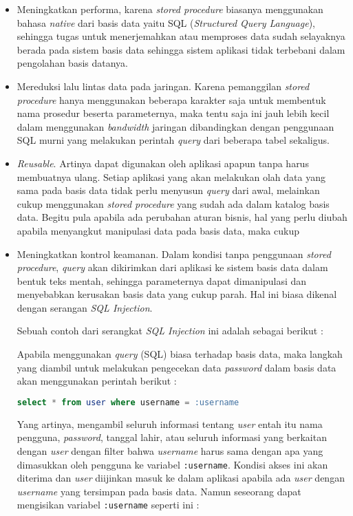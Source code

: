 \documentclass[pdftex,12pt, oneside]{article}
\begin{document}
\begin{itemize}
  \item Meningkatkan performa, karena \textit{stored procedure} biasanya menggunakan bahasa \textit{native} dari basis data yaitu SQL (\textit{Structured Query Language}), sehingga tugas untuk menerjemahkan atau memproses data sudah selayaknya berada pada sistem basis data sehingga sistem aplikasi tidak terbebani dalam pengolahan basis datanya.
  
  \item Mereduksi lalu lintas data pada jaringan. Karena pemanggilan \textit{stored procedure} hanya menggunakan beberapa karakter saja untuk membentuk nama prosedur beserta parameternya, maka tentu saja ini jauh lebih kecil dalam menggunakan \textit{bandwidth} jaringan dibandingkan dengan penggunaan SQL murni yang melakukan perintah \textit{query} dari beberapa tabel sekaligus.
  
  \item \textit{Reusable}. Artinya dapat digunakan oleh aplikasi apapun tanpa harus membuatnya ulang. Setiap aplikasi yang akan melakukan olah data yang sama pada basis data tidak perlu menyusun \textit{query} dari awal, melainkan cukup menggunakan \textit{stored procedure} yang sudah ada dalam katalog basis data. Begitu pula apabila ada perubahan aturan bisnis, hal yang perlu diubah apabila menyangkut manipulasi data pada basis data, maka cukup 
  
  \item Meningkatkan kontrol keamanan. Dalam kondisi tanpa penggunaan \textit{stored procedure}, \textit{query} akan dikirimkan dari aplikasi ke sistem basis data dalam bentuk teks mentah, sehingga parameternya dapat dimanipulasi dan menyebabkan kerusakan basis data yang cukup parah. Hal ini biasa dikenal dengan serangan \textit{SQL Injection}.
  
  Sebuah contoh dari serangkat \textit{SQL Injection} ini adalah sebagai berikut :
  
  Apabila menggunakan \textit{query} (SQL) biasa terhadap basis data, maka langkah yang diambil untuk melakukan pengecekan data \textit{password} dalam basis data akan menggunakan perintah berikut :
  
  \begin{lstlisting}[language=sql]
    select * from user where username = :username
  \end{lstlisting}
  
  Yang artinya, mengambil seluruh informasi tentang \textit{user} entah itu nama pengguna, \textit{password}, tanggal lahir, atau seluruh informasi yang berkaitan dengan \textit{user} dengan filter bahwa \textit{username} harus sama dengan apa yang dimasukkan oleh pengguna ke variabel \texttt{:username}. Kondisi akses ini akan diterima dan \textit{user} diijinkan masuk ke dalam aplikasi apabila ada \textit{user} dengan \textit{username} yang tersimpan pada basis data. Namun seseorang dapat mengisikan variabel \texttt{:username} seperti ini :
  

\end{itemize}
\end{document}
